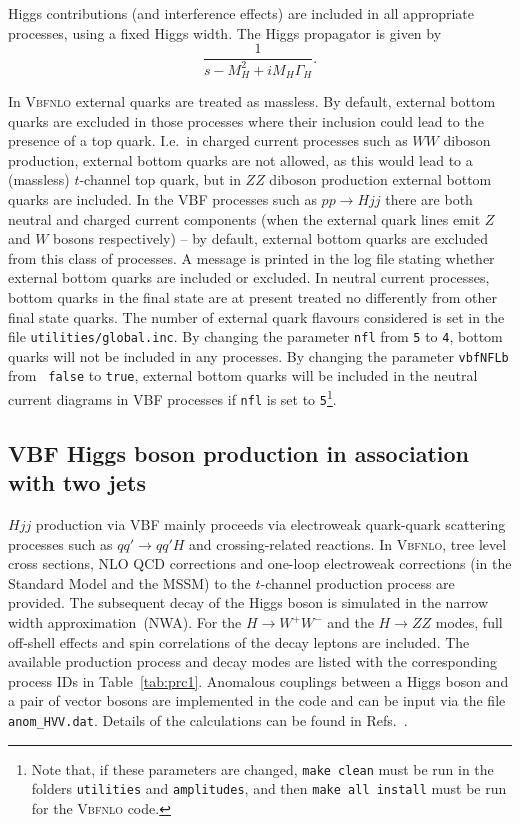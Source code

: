 \documentclass[english,12pt]{article}
\begin{document}
Higgs contributions (and interference effects) are included in all appropriate
processes, using a fixed Higgs width.  The Higgs propagator is given by
\begin{equation}
 \frac{1}{s - M_{H}^{2} + i M_{H} \Gamma_{H}} .
\end{equation}

In \textsc{Vbfnlo} external quarks are treated as massless.  By default,
external bottom quarks are excluded in those processes where their inclusion could lead to
the presence of a top quark.  I.e.\ in charged current processes such as $WW$
diboson production, external bottom quarks are not allowed, as this would lead
to a (massless) $t$-channel top quark, but in $ZZ$ diboson production external
bottom quarks are included.  In the VBF processes such as $pp \rightarrow Hjj$
there are both neutral and charged current components (when the external quark
lines emit $Z$ and $W$ bosons respectively) -- by default, external bottom
quarks are excluded from this class of processes.  A message is printed in the
log file stating whether external bottom quarks are included or excluded.  In
neutral current processes, bottom quarks in the final state are at present
treated no differently from other final state quarks.  The number of external
quark flavours considered is set in the file {\tt utilities/global.inc}.  By
changing the parameter {\tt nfl} from {\tt 5} to {\tt 4}, bottom quarks will not
be included in any processes.  By changing the parameter {\tt vbfNFLb} from {\tt
false} to {\tt true}, external bottom quarks will be included in the neutral
current diagrams in VBF processes if {\tt nfl} is set to {\tt 5}\footnote{Note
that, if these parameters are changed, {\tt make clean} must be run in
the folders {\tt utilities} and {\tt amplitudes}, and then {\tt make all
install} must be run for the \textsc{Vbfnlo} code.}.



\subsection{VBF Higgs boson production in association with two jets}
\label{sec:vbf-hjj}

$Hjj$ production via VBF mainly proceeds via electroweak quark-quark scattering
processes such as $qq'\to qq'H$ and crossing-related reactions. In
\textsc{Vbfnlo}, tree level cross sections, NLO QCD corrections and one-loop
electroweak corrections (in the Standard Model and the MSSM) to the $t$-channel
production process are provided. The subsequent decay of the Higgs boson is
simulated in the narrow width approximation~(NWA). For the $H\to W^+W^- $ and
the $H\to ZZ$ modes, full off-shell effects and spin correlations of the decay
leptons are included.   The available production process and decay modes are
listed with the corresponding process IDs in Table~\ref{tab:prc1}.  Anomalous
couplings between a Higgs boson and a pair of vector bosons are implemented in the
code and can be input via the file {\tt anom\_HVV.dat}.  Details of the 
calculations can be found in Refs.~\cite{Figy:2003nv,Hollik:2008xn,Figy:2010ct}. 
\end{document}
